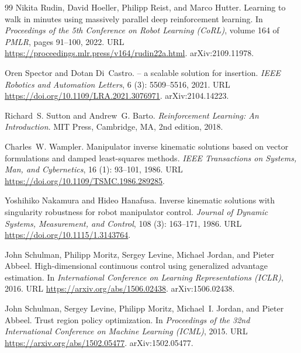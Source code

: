\documentclass[10pt]{article}
\begin{document}
\begin{thebibliography}{99}
Nikita Rudin, David Hoeller, Philipp Reist, and Marco Hutter.
\newblock Learning to walk in minutes using massively parallel deep
  reinforcement learning.
\newblock In \emph{Proceedings of the 5th Conference on Robot Learning (CoRL)},
  volume 164 of \emph{PMLR}, pages 91--100, 2022.
\newblock URL \url{https://proceedings.mlr.press/v164/rudin22a.html}.
\newblock arXiv:2109.11978.

Oren Spector and Dotan Di~Castro.
 -- a scalable solution for insertion.
\newblock \emph{IEEE Robotics and Automation Letters}, 6 (3):
  5509--5516, 2021.
\newblock URL \url{https://doi.org/10.1109/LRA.2021.3076971}.
\newblock arXiv:2104.14223.

Richard~S. Sutton and Andrew~G. Barto.
\newblock \emph{Reinforcement Learning: An Introduction}.
\newblock MIT Press, Cambridge, MA, 2nd edition, 2018.

Charles~W. Wampler.
\newblock Manipulator inverse kinematic solutions based on vector formulations
  and damped least-squares methods.
\newblock \emph{IEEE Transactions on Systems, Man, and Cybernetics},
  16 (1): 93--101, 1986.
\newblock URL \url{https://doi.org/10.1109/TSMC.1986.289285}.

Yoshihiko Nakamura and Hideo Hanafusa.
\newblock Inverse kinematic solutions with singularity robustness for robot
  manipulator control.
\newblock \emph{Journal of Dynamic Systems, Measurement, and Control},
  108 (3): 163--171, 1986.
\newblock URL \url{https://doi.org/10.1115/1.3143764}.

John Schulman, Philipp Moritz, Sergey Levine, Michael Jordan, and Pieter
  Abbeel.
\newblock High-dimensional continuous control using generalized advantage
  estimation.
\newblock In \emph{International Conference on Learning Representations
  (ICLR)}, 2016.
\newblock URL \url{https://arxiv.org/abs/1506.02438}.
\newblock arXiv:1506.02438.

John Schulman, Sergey Levine, Philipp Moritz, Michael~I. Jordan, and Pieter
  Abbeel.
\newblock Trust region policy optimization.
\newblock In \emph{Proceedings of the 32nd International Conference on Machine
  Learning (ICML)}, 2015.
\newblock URL \url{https://arxiv.org/abs/1502.05477}.
\newblock arXiv:1502.05477.


\end{thebibliography}
\end{document}
